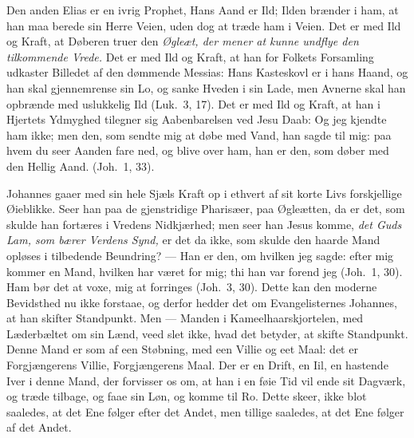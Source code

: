 \documentclass[12pt,a4paper]{book}
\begin{document}
Den anden Elias er en ivrig Prophet, Hans Aand er Ild; Ilden brænder i ham, at
han maa berede sin Herre Veien, uden dog at træde ham i Veien. Det er med Ild og
Kraft, at Døberen truer den \emph{Øgleæt, der mener at kunne undflye den
tilkommende Vrede.} Det er med Ild og Kraft, at han for Folkets Forsamling
udkaster Billedet af den dømmende Messias: {\large Hans Kasteskovl er i hans
Haand, og han skal gjennemrense sin Lo, og sanke Hveden i sin Lade, men Avnerne
skal han opbrænde med uslukkelig Ild (Luk.\ 3, 17).} Det er med Ild og Kraft, at
han i Hjertets Ydmyghed tilegner sig Aabenbarelsen ved Jesu Daab: {\large Og jeg
kjendte ham ikke; men den, som sendte mig at døbe med Vand, han sagde til mig:
paa hvem du seer Aanden fare ned, og blive over ham, han er den, som døber med
den Hellig Aand. (Joh.\ 1, 33).}

Johannes gaaer med sin hele Sjæls Kraft op i ethvert af sit
korte Livs forskjellige Øieblikke. Seer han paa de gjenstridige Pharisæer, paa
Øgleætten, da er det, som skulde han fortæres i Vredens Nidkjærhed; men seer han
Jesus komme, \emph{det Guds Lam, som bærer Verdens Synd,} er det da ikke, som
skulde den haarde Mand opløses i tilbedende Beundring? --- {\large Han er den, om
hvilken jeg sagde: efter mig kommer en Mand, hvilken har været for mig; thi han
var forend jeg (Joh.\ 1, 30). Ham bør det at voxe, mig at forringes (Joh.\ 3,
30).} Dette kan den moderne Bevidsthed nu ikke forstaae, og derfor hedder det om
Evangelisternes Johannes, at han skifter Standpunkt. Men --- Manden i
Kameelhaarskjortelen, med Læderbæltet om sin Lænd, veed slet ikke, hvad det
betyder, at skifte Standpunkt. Denne Mand er som af een Støbning, med een Villie
og eet Maal: det er Forgjængerens Villie, Forgjængerens Maal. Der er en Drift, en
Iil, en hastende Iver i denne Mand, der forvisser os om, at han i en føie Tid vil
ende sit Dagværk, og træde tilbage, og faae sin Løn, og komme til Ro. Dette skeer,
ikke blot saaledes, at det Ene følger efter det Andet, men tillige saaledes, at
det Ene følger af det Andet.
\end{document}
